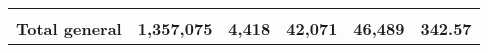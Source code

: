 \begin{tabular}{lrcclr}
	& \multicolumn{1}{l}{}                                           & \multicolumn{1}{l}{}                                       & \multicolumn{1}{l}{} &                                                                     & \multicolumn{1}{l}{}                                                         \\
	\rowcolor[HTML]{DDEBF7} 
	\textbf{Total   general}                                       & \textbf{1,357,075}                                             & \multicolumn{1}{r}{\cellcolor[HTML]{DDEBF7}\textbf{4,418}} & \textbf{42,071}      & \textbf{46,489}                                                     & \textbf{342.57}                                                             
\end{tabular}